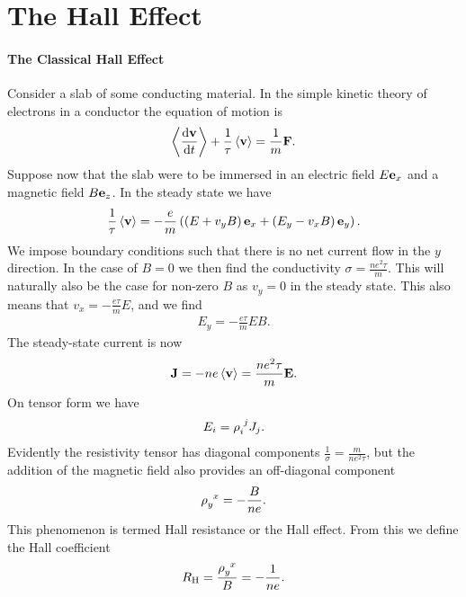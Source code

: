 \section{The Hall Effect}

\paragraph{The Classical Hall Effect}
Consider a slab of some conducting material. In the simple kinetic theory of electrons in a conductor the equation of motion is
\begin{align*}
	\expval{\dv{\vb{v}}{t}} + \frac{1}{\tau}\expval{\vb{v}} = \frac{1}{m}\vb{F}.
\end{align*}
Suppose now that the slab were to be immersed in an electric field $E\vb{e}_{x}$ and a magnetic field $B\vb{e}_{z}$. In the steady state we have
\begin{align*}
	\frac{1}{\tau}\expval{\vb{v}} = -\frac{e}{m}\left(\left(E + v_{y}B\right)\vb{e}_{x} + \left(E_{y} - v_{x}B\right)\vb{e}_{y}\right).
\end{align*}
We impose boundary conditions such that there is no net current flow in the $y$ direction. In the case of $B = 0$ we then find the conductivity $\sigma = \frac{ne^{2}\tau}{m}$. This will naturally also be the case for non-zero $B$ as $v_{y} = 0$ in the steady state. This also means that $v_{x} = -\frac{e\tau}{m}E$, and we find
\begin{align*}
	E_{y} = -\frac{e\tau}{m}EB.
\end{align*}
The steady-state current is now
\begin{align*}
	\vb{J} = -ne\expval{\vb{v}} = \frac{ne^{2}\tau}{m}\vb{E}.
\end{align*}
On tensor form we have
\begin{align*}
	E_{i} = \tensor{\rho}{_{i}^{j}}J_{j}.
\end{align*}
Evidently the resistivity tensor has diagonal components $\frac{1}{\sigma} = \frac{m}{ne^{2}\tau}$, but the addition of the magnetic field also provides an off-diagonal component
\begin{align*}
	\tensor{\rho}{_{y}^{x}} = -\frac{B}{ne}.
\end{align*}
This phenomenon is termed Hall resistance or the Hall effect. From this we define the Hall coefficient
\begin{align*}
	R_{\text{H}} = \frac{\tensor{\rho}{_{y}^{x}}}{B} = -\frac{1}{ne}.
\end{align*}

